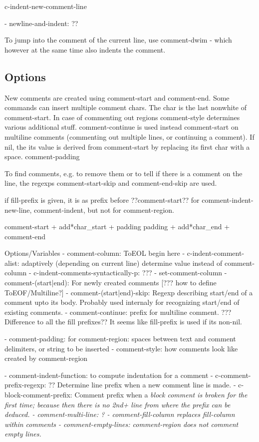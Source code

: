 \documentclass[a4paper]{report}
\begin{document}
c-indent-new-comment-line

- newline-and-indent: ??

To jump into the comment of the current line, use comment-dwim - which
however at the same time also indents the comment.

\subsection{Options}

New comments are created using comment-start and comment-end. Some 
commands can insert multiple comment chars. The char is the last
nonwhite of comment-start. In case of commenting out regions
comment-style determines various additional stuff. comment-continue is
used instead comment-start on multiline comments (commenting out
multiple lines, or continuing a comment). If nil, the its value is
derived from comment-start by replacing its first char with a space.
comment-padding 

To find comments, e.g. to remove them or to tell if there is a comment on
the line, the regexps comment-start-skip and comment-end-skip are
used. 

if fill-prefix is given, it is as prefix before ??comment-start?? for
comment-indent-new-line, comment-indent, but not for comment-region.


comment-start + add*char_start + padding
padding + add*char_end + comment-end

Options/Variables
- comment-column: ToEOL begin here
- c-indent-comment-alist: adaptively (depending on current line)
determine value instead of comment-column
- c-indent-comments-syntactically-p: ???
- set-comment-column
- comment-(start|end): For newly created comments [??? how to define ToEOF/Multiline?]
- comment-(start|end)-skip: Regexp describing start/end of a comment
upto its body. Probably used internaly for recognizing start/end of
existing comments.
- comment-continue: prefix for multiline comment. ??? Difference to all the
fill prefixes?? It seems like fill-prefix is used if its non-nil.

- comment-padding: for comment-region: spaces between text and comment
  delimiters, or string to be inserted
- comment-style: how comments look like created by comment-region 

- comment-indent-function: to compute indentation for a comment
- c-comment-prefix-regexp: ?? Determine line prefix when a new comment
  line is made.
- c-block-comment-prefix: Comment prefix when a \em{block} comment is broken
  for the first time; because then there is no 2nd+ line from where the
  prefix can be deduced.
- comment-multi-line: ?
- comment-fill-column replaces fill-column within comments
- comment-empty-lines: comment-region does not comment empty lines.  
\end{document}

